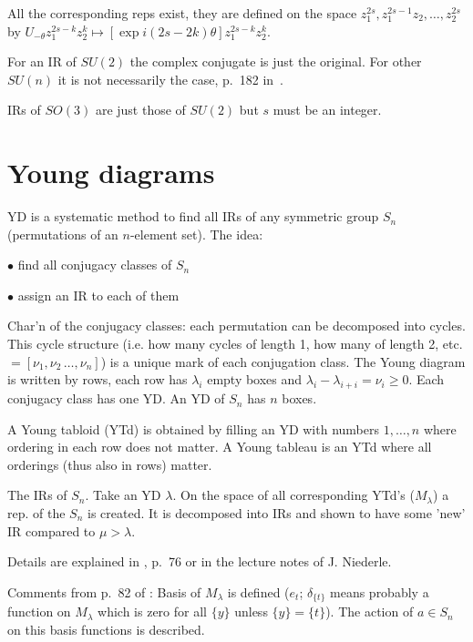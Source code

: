 All the corresponding reps exist, they are defined on the space
$z_1^{2s},z_1^{2s-1}z_2,\ldots, z_2^{2s}$ by
$U_{-\theta}z_1^{2s-k}z_2^k\mapsto [\exp i(2s-2k)\theta]z_1^{2s-k}z_2^k$.
 
For an IR of $SU(2)$ the complex conjugate is just the original. For other
$SU(n)$ it is not necessarily the case, p.~182 in~\cite{sternberg}.

IRs of $SO(3)$ are just those of $SU(2)$ but $s$ must be an integer.




\section{Young diagrams}

YD is a systematic method to find all IRs of any symmetric group $S_n$
(permutations of an $n$-element set). The idea:

\item{$\bullet$} find all conjugacy classes of $S_n$

\item{$\bullet$} assign an IR to each of them

\noindent
Char'n of the conjugacy classes: each permutation can be decomposed into
cycles. This cycle structure (i.e. how many cycles of length 1, how many of
length 2, etc. $=[\nu_1,\nu_2\,\ldots,\nu_n]$) is a unique mark of each
conjugation class. The Young diagram is written by rows, each row has
$\lambda_i$ empty boxes and $\lambda_i-\lambda_{i+i}=\nu_i\ge 0$. Each
conjugacy class has one YD. An YD of $S_n$ has $n$ boxes.

A Young tabloid (YTd) is obtained by filling an YD with numbers $1,\ldots,n$ where
ordering in each row does not matter. A Young tableau is an YTd where all
orderings (thus also in rows) matter.

The IRs of $S_n$. Take an YD $\lambda$. On the space of all corresponding
YTd's ($M_\lambda$) a rep. of the $S_n$ is created. It is decomposed into IRs
and shown to have some 'new' IR compared to $\mu>\lambda$.


Details are explained in \cite{sternberg}, p.~76 or in the lecture notes of
J. Niederle.  


Comments from p.~82 of \cite{sternberg}:
Basis of $M_\lambda$ is defined ($e_t$; $\delta_{\{t\}}$ means probably a function on
$M_\lambda$ which is zero for all $\{y\}$ unless $\{y\}=\{t\}$). The action of
$a\in S_n$ on this basis functions is described.





